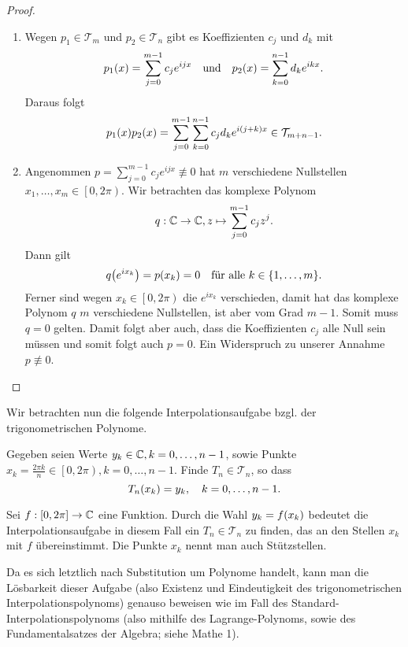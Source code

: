\documentclass{lecture}
\begin{document}
    \begin{proof}
        \begin{enumerate}
            \item Wegen \(p_1 \in \mathcal{T}_m\) und \(p_2 \in \mathcal{T}_n\) gibt es Koeffizienten \(c_j\) und \(d_k\) mit
            \[
                p_1\parentheses*{x} = \sum_{j = 0}^{m - 1}c_j e^{ijx} \quad \text{und} \quad p_2\parentheses*{x} = \sum_{k = 0}^{n - 1}d_k e^{ikx}.
            \]
            Daraus folgt
            \[
                p_1\parentheses*{x}p_2\parentheses*{x} = \sum_{j = 0}^{m - 1}\sum_{k = 0}^{n - 1}c_j d_k e^{i\parentheses*{j + k}x} \in \mathcal{T}_{m + n - 1}.
            \]
            \item Angenommen \(p = \sum_{j = 0}^{m - 1}c_j e^{ijx} \not\equiv 0\) hat \(m\) verschiedene Nullstellen \(x_1, \ldots, x_m \in \left[0, 2\pi\right)\).
            Wir betrachten das komplexe Polynom
            \[
                q: \C \to \C, z \mapsto \sum_{j = 0}^{m - 1}c_j z^j.
            \]
            Dann gilt
            \[
                q\parentheses*{e^{ix_k}} = p\parentheses*{x_k} = 0 \quad \text{für alle }k \in \braces*{1, \ldots, m}.
            \]
            Ferner sind wegen \(x_k \in \left[0, 2\pi\right)\) die \(e^{ix_k}\) verschieden, damit hat das komplexe Polynom \(q\) \(m\) verschiedene Nullstellen, ist aber vom Grad \(m - 1\).
            Somit muss \(q = 0\) gelten.
            Damit folgt aber auch, dass die Koeffizienten \(c_j\) alle Null sein müssen und somit folgt auch \(p = 0\).
            Ein Widerspruch zu unserer Annahme \(p \not\equiv 0\).
        \end{enumerate}
    \end{proof}

    Wir betrachten nun die folgende Interpolationsaufgabe bzgl. der trigonometrischen Polynome.
    \begin{problem}
        Gegeben seien Werte \(y_k \in \C, k = 0, \ldots, n - 1\), sowie Punkte \(x_k = \frac{2\pi k}{n} \in \left[0, 2\pi\right), k = 0, \ldots, n - 1\).
        Finde \(T_n \in \mathcal{T}_n\), so dass
        \[
            T_n\parentheses*{x_k} = y_k, \quad k = 0, \ldots, n - 1.
        \]
    \end{problem}
    \begin{remark}
        Sei \(f: \brackets*{0, 2\pi} \to \C\) eine Funktion.
        Durch die Wahl \(y_k = f\parentheses*{x_k}\) bedeutet die Interpolationsaufgabe in diesem Fall ein \(T_n \in \mathcal{T}_n\) zu finden, das an den Stellen \(x_k\) mit \(f\) übereinstimmt.
        Die Punkte \(x_k\) nennt man auch Stützstellen.
    \end{remark}
    \begin{remark}
        Da es sich letztlich nach Substitution um Polynome handelt, kann man die Lösbarkeit dieser Aufgabe (also Existenz und Eindeutigkeit des trigonometrischen Interpolationspolynoms) genauso beweisen wie im Fall des Standard-Interpolationspolynoms (also mithilfe des Lagrange-Polynoms, sowie des Fundamentalsatzes der Algebra; siehe Mathe 1).
    \end{remark}
\end{document}

